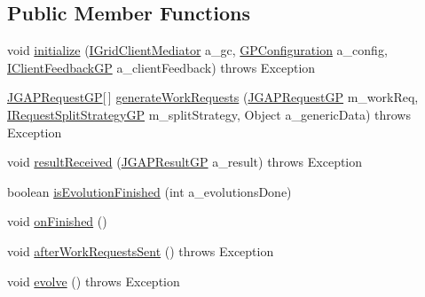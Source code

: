 \subsection*{Public Member Functions}
\begin{DoxyCompactItemize}
\item 
void \hyperlink{interfaceorg_1_1jgap_1_1distr_1_1grid_1_1gp_1_1_i_client_evolve_strategy_g_p_ab76c8cf38dffd5b221d15a123117977e}{initialize} (\hyperlink{interfaceorg_1_1jgap_1_1distr_1_1grid_1_1_i_grid_client_mediator}{I\-Grid\-Client\-Mediator} a\-\_\-gc, \hyperlink{classorg_1_1jgap_1_1gp_1_1impl_1_1_g_p_configuration}{G\-P\-Configuration} a\-\_\-config, \hyperlink{interfaceorg_1_1jgap_1_1distr_1_1grid_1_1gp_1_1_i_client_feedback_g_p}{I\-Client\-Feedback\-G\-P} a\-\_\-client\-Feedback)  throws Exception
\item 
\hyperlink{classorg_1_1jgap_1_1distr_1_1grid_1_1gp_1_1_j_g_a_p_request_g_p}{J\-G\-A\-P\-Request\-G\-P}\mbox{[}$\,$\mbox{]} \hyperlink{interfaceorg_1_1jgap_1_1distr_1_1grid_1_1gp_1_1_i_client_evolve_strategy_g_p_a675abba93f0c6a61a65abe2989cd1ee2}{generate\-Work\-Requests} (\hyperlink{classorg_1_1jgap_1_1distr_1_1grid_1_1gp_1_1_j_g_a_p_request_g_p}{J\-G\-A\-P\-Request\-G\-P} m\-\_\-work\-Req, \hyperlink{interfaceorg_1_1jgap_1_1distr_1_1grid_1_1gp_1_1_i_request_split_strategy_g_p}{I\-Request\-Split\-Strategy\-G\-P} m\-\_\-split\-Strategy, Object a\-\_\-generic\-Data)  throws Exception
\item 
void \hyperlink{interfaceorg_1_1jgap_1_1distr_1_1grid_1_1gp_1_1_i_client_evolve_strategy_g_p_ad708737e147a6f137ec781ebbe503708}{result\-Received} (\hyperlink{classorg_1_1jgap_1_1distr_1_1grid_1_1gp_1_1_j_g_a_p_result_g_p}{J\-G\-A\-P\-Result\-G\-P} a\-\_\-result)  throws Exception
\item 
boolean \hyperlink{interfaceorg_1_1jgap_1_1distr_1_1grid_1_1gp_1_1_i_client_evolve_strategy_g_p_a711c5374d9361315b98adce367f03f83}{is\-Evolution\-Finished} (int a\-\_\-evolutions\-Done)
\item 
void \hyperlink{interfaceorg_1_1jgap_1_1distr_1_1grid_1_1gp_1_1_i_client_evolve_strategy_g_p_a5a40e890c238063fed1bf5dd29e285af}{on\-Finished} ()
\item 
void \hyperlink{interfaceorg_1_1jgap_1_1distr_1_1grid_1_1gp_1_1_i_client_evolve_strategy_g_p_a28e301d50415b299df8e7763c24339a5}{after\-Work\-Requests\-Sent} ()  throws Exception
\item 
void \hyperlink{interfaceorg_1_1jgap_1_1distr_1_1grid_1_1gp_1_1_i_client_evolve_strategy_g_p_a619e125147a01c4ce49f1aab6783f787}{evolve} ()  throws Exception
\end{DoxyCompactItemize}
